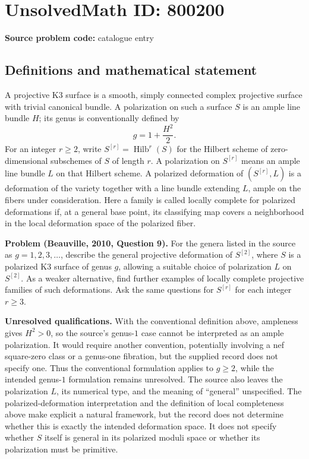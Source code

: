 \documentclass[11pt]{article}
\begin{document}
\section*{UnsolvedMath ID: 800200}
\textbf{Source problem code:} catalogue entry
\subsection{Definitions and mathematical statement}
A projective K3 surface is a smooth, simply connected complex projective surface with trivial canonical bundle. A polarization on such a surface \(S\) is an ample line bundle \(H\); its genus is conventionally defined by
\[
g=1+\frac{H^2}{2}.
\]
For an integer \(r\geq 2\), write \(S^{[r]}=\operatorname{Hilb}^r(S)\) for the Hilbert scheme of zero-dimensional subschemes of \(S\) of length \(r\). A polarization on \(S^{[r]}\) means an ample line bundle \(L\) on that Hilbert scheme. A polarized deformation of \((S^{[r]},L)\) is a deformation of the variety together with a line bundle extending \(L\), ample on the fibers under consideration. Here a family is called locally complete for polarized deformations if, at a general base point, its classifying map covers a neighborhood in the local deformation space of the polarized fiber.

\textbf{Problem (Beauville, 2010, Question 9).} For the genera listed in the source as \(g=1,2,3,\ldots\), describe the general projective deformation of \(S^{[2]}\), where \(S\) is a polarized K3 surface of genus \(g\), allowing a suitable choice of polarization \(L\) on \(S^{[2]}\). As a weaker alternative, find further examples of locally complete projective families of such deformations. Ask the same questions for \(S^{[r]}\) for each integer \(r\geq 3\).

\textbf{Unresolved qualifications.} With the conventional definition above, ampleness gives \(H^2>0\), so the source's genus-\(1\) case cannot be interpreted as an ample polarization. It would require another convention, potentially involving a nef square-zero class or a genus-one fibration, but the supplied record does not specify one. Thus the conventional formulation applies to \(g\geq 2\), while the intended genus-\(1\) formulation remains unresolved. The source also leaves the polarization \(L\), its numerical type, and the meaning of ``general'' unspecified. The polarized-deformation interpretation and the definition of local completeness above make explicit a natural framework, but the record does not determine whether this is exactly the intended deformation space. It does not specify whether \(S\) itself is general in its polarized moduli space or whether its polarization must be primitive.
\end{document}
